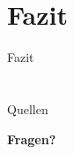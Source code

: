 \documentclass{beamer}
\begin{document}
\section{Fazit}
\begin{frame}{Fazit}

\end{frame}

\section{}
\begin{frame}{Quellen}	
	\tiny{
		\nocite{thesms,tutgsm,wikipedia:smsgsm}
		
	}
\end{frame}


\begin{frame}
	\begin{center}
	\Huge{\textbf{Fragen?}}
	\end{center}
\end{frame}
\end{document}
